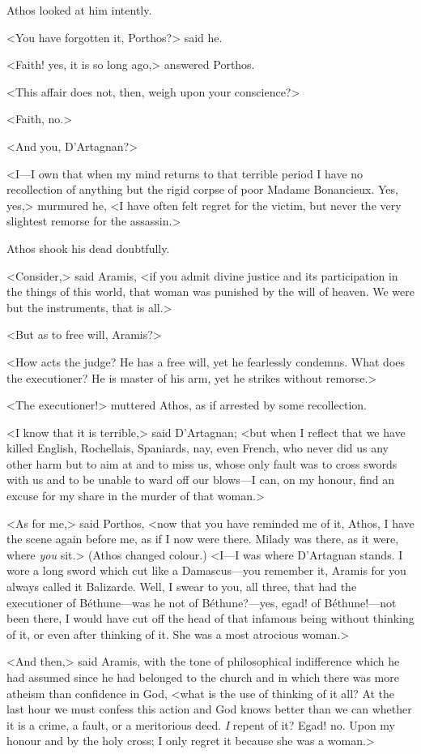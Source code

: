 Athos looked at him intently.

<You have forgotten it, Porthos?> said he.

<Faith! yes, it is so long ago,> answered Porthos.

<This affair does not, then, weigh upon your conscience?>

<Faith, no.>

<And you, D'Artagnan?>

<I—I own that when my mind returns to that terrible period I have no recollection of anything but the rigid corpse of poor Madame Bonancieux. Yes, yes,> murmured he, <I have often felt regret for the victim, but never the very slightest remorse for the assassin.>

Athos shook his dead doubtfully.

<Consider,> said Aramis, <if you admit divine justice and its participation in the things of this world, that woman was punished by the will of heaven. We were but the instruments, that is all.>

<But as to free will, Aramis?>

<How acts the judge? He has a free will, yet he fearlessly condemns. What does the executioner? He is master of his arm, yet he strikes without remorse.>

<The executioner!> muttered Athos, as if arrested by some recollection.

<I know that it is terrible,> said D'Artagnan; <but when I reflect that we have killed English, Rochellais, Spaniards, nay, even French, who never did us any other harm but to aim at and to miss us, whose only fault was to cross swords with us and to be unable to ward off our blows—I can, on my honour, find an excuse for my share in the murder of that woman.>

<As for me,> said Porthos, <now that you have reminded me of it, Athos, I have the scene again before me, as if I now were there. Milady was there, as it were, where \emph{you} sit.> (Athos changed colour.) <I—I was where D'Artagnan stands. I wore a long sword which cut like a Damascus—you remember it, Aramis for you always called it Balizarde. Well, I swear to you, all three, that had the executioner of Béthune—was he not of Béthune?—yes, egad! of Béthune!—not been there, I would have cut off the head of that infamous being without thinking of it, or even after thinking of it. She was a most atrocious woman.>

<And then,> said Aramis, with the tone of philosophical indifference which he had assumed since he had belonged to the church and in which there was more atheism than confidence in God, <what is the use of thinking of it all? At the last hour we must confess this action and God knows better than we can whether it is a crime, a fault, or a meritorious deed. \emph{I} repent of it? Egad! no. Upon my honour and by the holy cross; I only regret it because she was a woman.>

